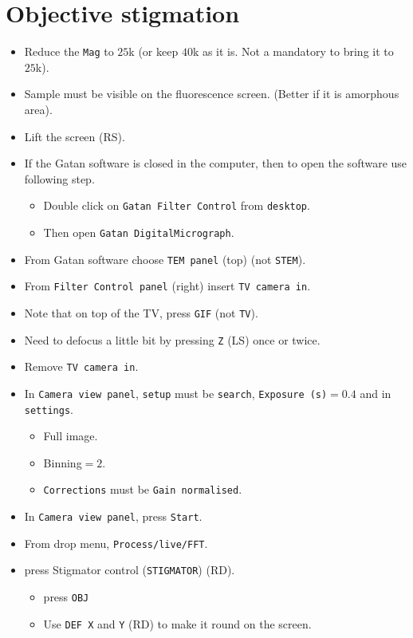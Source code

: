 \documentclass[letterpaper,12pt]{article}
\begin{document}
\section{Objective stigmation}
\begin{itemize}
\item Reduce the \texttt{Mag} to $25$k (or keep $40$k as it is. Not a mandatory to bring it to $25$k).
\item Sample must be visible on the fluorescence screen. (Better if it is amorphous area).
\item Lift the screen (RS\footnotemark[1]).
\item If the Gatan software is closed in the computer, then to open the software use following step.
\begin{itemize}
\item Double click on \texttt{Gatan Filter Control} from \texttt{desktop}.
\item Then open \texttt{Gatan DigitalMicrograph}. 
\end{itemize}
\item From Gatan software choose \texttt{TEM panel} (top) (not \texttt{STEM}).
\item From \texttt{Filter Control panel} (right) insert \texttt{TV camera in}.
\item Note that on top of the TV, press \texttt{GIF} (not \texttt{TV}).
\item Need to defocus a little bit by pressing \texttt{Z} (LS\footnotemark[1]) once or twice.
\item Remove \texttt{TV camera in}.
\item In \texttt{Camera view panel}, \texttt{setup} must be \texttt{search}, \texttt{Exposure (s)}$=0.4$ and in \texttt{settings}.
\begin{itemize}
\item Full image.
\item Binning$=2$.
\item \texttt{Corrections} must be \texttt{Gain normalised}.
\end{itemize}
\item In \texttt{Camera view panel}, press \texttt{Start}.
\item From drop menu, \texttt{Process/live/FFT}.
\item press Stigmator control (\texttt{STIGMATOR}) (RD\footnotemark[1]).
\begin{itemize}
\item press \texttt{OBJ}
\item Use \texttt{DEF X} and \texttt{Y} (RD\footnotemark[1]) to make it round on the screen.
\end{itemize}
\end{itemize}
\end{document}
